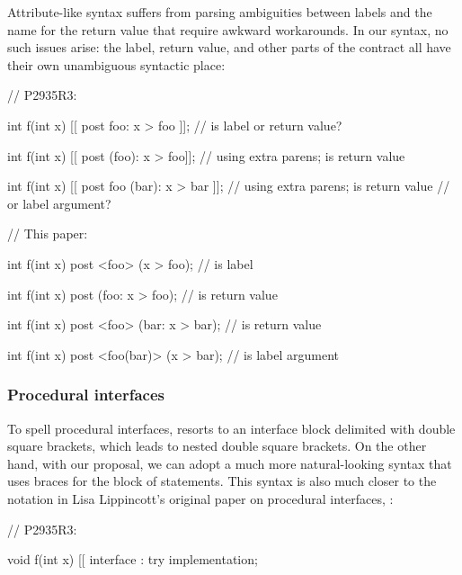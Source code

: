 Attribute-like syntax suffers from parsing ambiguities between labels and the name for the return value that require awkward workarounds. In our syntax, no such issues arise: the label, return value, and other parts of the contract all have their own unambiguous syntactic place:

\begin{minipage}[t]{8cm}
\begin{codeblock}
// P2935R3:

int f(int x)
  [[ post foo: x > foo ]];  
  // is  label or return value?

int f(int x)
  [[ post (foo): x > foo]];  
  // using extra parens;  is return value

int f(int x)
  [[ post foo (bar): x > bar ]];  
  // using extra parens; is  return value
  // or label argument?
\end{codeblock}
\end{minipage}
\begin{minipage}[t]{8cm}
\begin{codeblock}
// This paper:

int f(int x)
  post <foo> (x > foo);
  //  is label

int f(int x)
  post (foo: x > foo);
  //  is return value

int f(int x)
  post <foo> (bar: x > bar); 
  //   is return value

int f(int x)
  post <foo(bar)> (x > bar);
  //  is label argument
\end{codeblock}
\end{minipage}

\subsubsection{Procedural interfaces}
\label{subsubsec:comp_interfaces}

To spell procedural interfaces, \cite{P2935R3} resorts to an interface block delimited with double square brackets, which leads to nested double square brackets. On the other hand, with our proposal, we can adopt a much more natural-looking syntax that uses braces for the block of statements. This syntax is also much closer to the notation in Lisa Lippincott's original paper on procedural interfaces, \cite{P0465R0}:

\begin{minipage}{8cm}
\begin{codeblock}
// P2935R3:

void f(int x)
  [[ interface :
    try {
      implementation;
    }
\end{codeblock}
\end{minipage}
\begin{minipage}{8cm}
\begin{codeblock}
// This paper:

void f(int x)
interface {
  try {
    implementation;
  }
\end{codeblock}
\end{minipage}

